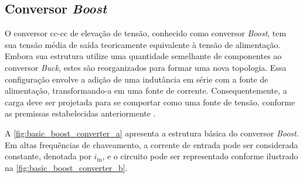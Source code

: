 \subsection{Conversor \textit{Boost}}

O conversor \acrshort{cc}-\acrshort{cc} de elevação de tensão, conhecido como conversor \textit{Boost}, tem sua tensão média de saída teoricamente equivalente à tensão de alimentação. Embora sua estrutura utilize uma quantidade semelhante de componentes ao conversor \textit{Buck}, estes são reorganizados para formar uma nova topologia. Essa configuração envolve a adição de uma indutância em série com a fonte de alimentação, transformando-a em uma fonte de corrente. Consequentemente, a carga deve ser projetada para se comportar como uma fonte de tensão, conforme as premissas estabelecidas anteriormente \citep{martins2008}.

A \autoref{fig:basic_boost_converter_a} apresenta a estrutura básica do conversor \textit{Boost}. Em altas frequências de chaveamento, a corrente de entrada pode ser considerada constante, denotada por $i_{\mathrm{in}}$, e o circuito pode ser representado conforme ilustrado na \autoref{fig:basic_boost_converter_b}.

